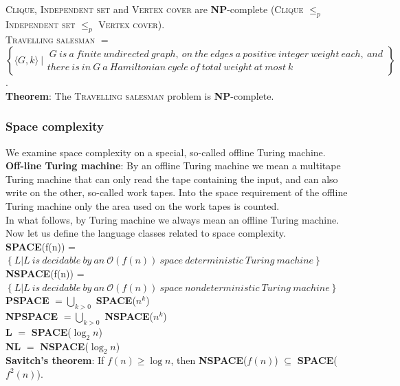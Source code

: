\documentclass[margin=0px]{article}
\begin{document}
\noindent \textsc{Clique}, \textsc{Independent set} and \textsc{Vertex cover} are \textbf{NP}-complete
(\textsc{Clique} $\leq_{p}$ \textsc{Independent set} $\leq_{p}$ \textsc{Vertex cover}).\\

\noindent \textsc{Travelling salesman} $=$\\
$\left\{\langle G, k \rangle \ |
    \begin{array}{lr}
        \ G \ is \ a \ finite \ undirected \ graph, \ on \ the \ edges \ a \
        positive \ integer \ weight \ each, \ and \\
        there \ is \ in \ G \ a \ Hamiltonian \ cycle \ of \ total \ weight \ at \ most \ k
    \end{array}
    \right\}$.\\

\noindent \textbf{Theorem}: The \textsc{Travelling salesman} problem is \textbf{NP}-complete.

\subsubsection{Space complexity}
We examine space complexity on a special, so-called offline Turing machine.\\

\noindent \textbf{Off-line Turing machine}: By an offline Turing machine we mean a multitape Turing machine
that can only read the tape containing the input, and can also write on the other, so-called work tapes.
Into the space requirement of the offline Turing machine only the area used on the work tapes is counted.\\

In what follows, by Turing machine we always mean an offline Turing machine. Now let us
define the language classes related to space complexity.\\

\noindent \textbf{SPACE}(f(n)) = $\left\{L|L \ is \ decidable \ by \ an \ \mathcal{O}(f(n)) \ space \
    deterministic \ Turing \ machine \right\}$\\

\noindent \textbf{NSPACE}(f(n)) = $\left\{L|L \ is \ decidable \ by \ an \ \mathcal{O}(f(n)) \ space \
    nondeterministic \ Turing \ machine \right\}$\\

\noindent \textbf{PSPACE} $=\bigcup_{k > 0}$ \textbf{SPACE}($n^{k}$)\\

\noindent \textbf{NPSPACE} $=\bigcup_{k > 0}$ \textbf{NSPACE}($n^{k}$)\\

\noindent \textbf{L} $=$ \textbf{SPACE}($\log_{2} n$) \\

\noindent \textbf{NL} $=$ \textbf{NSPACE}($\log_{2} n$) \\

\noindent \textbf{Savitch's theorem}: If $f(n) \geq \log n$, then \textbf{NSPACE}($f(n)$) $\subseteq$ \textbf{SPACE}($f^{2}(n)$).
\end{document}
